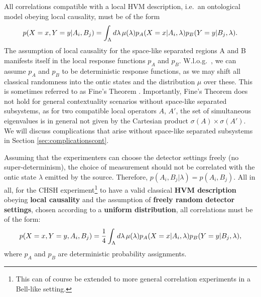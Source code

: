 All correlations compatible with a local HVM description, i.e.\ an ontological model obeying local causality, must be of the form
\begin{equation*}
p(X=x,Y=y\vert A_i,B_j)=\int_{\Lambda}d\lambda\thinspace\mu(\lambda)p_{A}(X=x\vert A_i, \lambda)p_{B}(Y=y\vert B_j, \lambda).
\end{equation*}
The assumption of local causality for the space-like separated regions A and B manifests itself in the local response functions $p_A$ and $p_B$. W.l.o.g.\ , we can assume $p_A$ and $p_B$ to be deterministic response functions, as we may shift all classical randomness into the ontic states and the distribution $\mu$ over these. This is sometimes referred to as Fine's Theorem \cite{Fine1982}. Importantly, Fine's Theorem does not hold for general contextuality scenarios without space-like separated subsystems, as for two compatible local operators $A$, $A'$, the set of simultaneous eigenvalues is in general not given by the Cartesian product $\sigma(A)\times\sigma(A')$. We will discuss complications that arise without space-like separated subsystems in Section \ref{sec:complicationscont}.

Assuming that the experimenters can choose the detector settings freely (no super-determinism), the choice of measurement should not be correlated with the ontic state $\lambda$ emitted by the source. Therefore, $p(A_i,B_j\vert \lambda)=p(A_i,B_j)$. All in all, for the CHSH experiment\footnote{This can of course be extended to more general correlation experiments in a Bell-like setting.} to have a valid classical \textbf{HVM description} obeying \textbf{local causality} and the assumption of \textbf{freely random detector settings}, chosen according to a \textbf{uniform distribution}, all correlations must be of the form:
\begin{equation}
\label{eqn:lhvm}
p(X=x,Y=y,A_i,B_j)=\frac{1}{4}\int_{\Lambda}d\lambda\thinspace\mu(\lambda)p_{A}(X=x\vert A_i, \lambda)p_{B}(Y=y\vert B_j, \lambda),
\end{equation}
where $p_A$ and $p_B$ are deterministic probability assignments.

